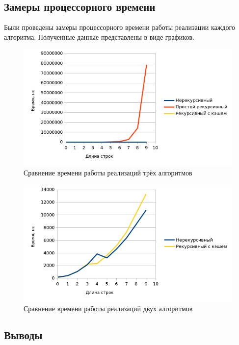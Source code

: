 \documentclass[oneside, a4paper, 12pt]{article}
\begin{document}
\subsection{Замеры процессорного времени}

Были проведены замеры процессорного времени работы реализации
каждого алгоритма. Полученные данные представлены в виде графиков.

\begin{figure}[ht]
    \centering
    \includegraphics[width=\textwidth]{plt-01.png}
    \caption{Сравнение времени работы реализаций трёх алгоритмов}
\end{figure}

\begin{figure}[ht]
    \centering
    \includegraphics[width=\textwidth]{plt-02.png}
    \caption{Сравнение времени работы реализаций двух алгоритмов}
\end{figure}

\subsection{Выводы}
\end{document}

